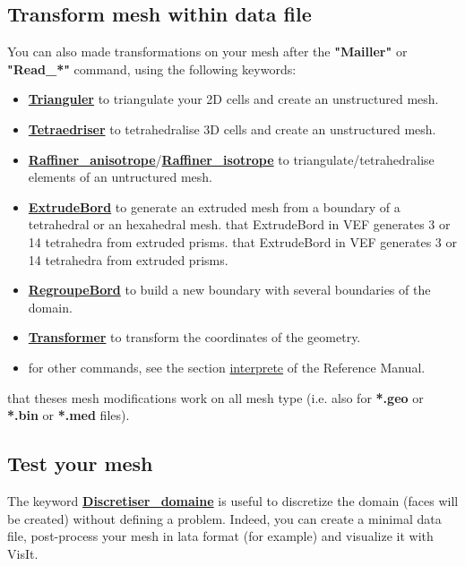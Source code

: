 \subsection{Transform mesh within data file}
You can also made transformations on your mesh after the \textbf{"Mailler"} or \textbf{"Read\_*"} command, using the following keywords:
\begin{itemize}
\item \href{../../Outils/TRIOXDATA/XTriou/doc.pdf\#triangulate}{\textbf{Trianguler}} to triangulate your 2D cells and create an unstructured mesh.
\item \href{../../Outils/TRIOXDATA/XTriou/doc.pdf\#tetraedriser}{\textbf{Tetraedriser}} to tetrahedralise 3D cells and create an unstructured mesh.
\item \href{../../Outils/TRIOXDATA/XTriou/doc.pdf\#raffineranisotrope}{\textbf{Raffiner\_anisotrope}}/\href{../../Outils/TRIOXDATA/XTriou/doc.pdf\#raffinerisotrope}{\textbf{Raffiner\_isotrope}} to triangulate/tetrahedralise elements of an untructured mesh.
\item \href{../../Outils/TRIOXDATA/XTriou/doc.pdf\#extrudebord}{\textbf{ExtrudeBord}} to generate an extruded mesh from a boundary of a tetrahedral or an hexahedral mesh. \Note that ExtrudeBord in VEF generates 3 or 14 tetrahedra from extruded prisms.
\Note that ExtrudeBord in VEF generates 3 or 14 tetrahedra from extruded prisms.
\item \href{../../Outils/TRIOXDATA/XTriou/doc.pdf\#regroupebord}{\textbf{RegroupeBord}} to build a new boundary with several boundaries of the domain.
\item \href{../../Outils/TRIOXDATA/XTriou/doc.pdf\#transformer}{\textbf{Transformer}} to transform the coordinates of the geometry.
\item for other commands, see the section \href{../../Outils/TRIOXDATA/XTriou/doc.pdf\#interprete}{interprete} of the \trust Reference Manual.
\end{itemize}

\Note that theses mesh modifications work on all mesh type (i.e. also for \textbf{*.geo} or \textbf{*.bin} or \textbf{*.med} files).



\subsection{Test your mesh}
The keyword \href{../../Outils/TRIOXDATA/XTriou/doc.pdf\#discretiserdomaine}{\textbf{Discretiser\_domaine}} is useful to discretize the domain (faces will be created) without defining a problem.
Indeed, you can create a minimal data file, post-process your mesh in lata format (for example) and visualize it with VisIt. \\

